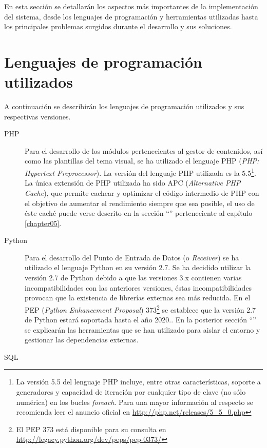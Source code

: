 En esta sección se detallarán los aspectos más importantes de la implementación del sistema, desde los lenguajes de programación y herramientas utilizadas hasta los principales problemas surgidos durante el desarrollo y sus soluciones.


\section{Lenguajes de programación utilizados}
\label{implementacion:lenguajes_programacion}

A continuación se describirán los lenguajes de programación utilizados y sus respectivas versiones.
\begin{description}
	\item[PHP]
		Para el desarrollo de los módulos pertenecientes al gestor de contenidos, así como las plantillas del tema visual, se ha utilizado el lenguaje PHP (\textit{PHP: Hypertext Preprocessor}).  La versión del lenguaje PHP utilizada es la 5.5\footnote{La versión 5.5 del lenguaje PHP incluye, entre otras características, soporte a generadores y capacidad de iteración por cualquier tipo de clave (no sólo numérica) en los bucles \textit{foreach}.  Para una mayor información al respecto se recomienda leer el anuncio oficial en \url{http://php.net/releases/5_5_0.php}}.  La única extensión de PHP utilizada ha sido APC (\textit{Alternative PHP Cache}), que permite cachear y optimizar el código intermedio de PHP con el objetivo de aumentar el rendimiento siempre que sea posible, el uso de éste caché puede verse descrito en la sección ``'' perteneciente al capítulo \ref{chapter05}.
	\item[Python]
		Para el desarrollo del Punto de Entrada de Datos (o \textit{Receiver}) se ha utilizado el lenguaje Python en su versión 2.7. Se ha decidido utilizar la versión 2.7 de Python debido a que las versiones 3.x contienen varias incompatibilidades con las anteriores versiones, éstas incompatibilidades provocan que la existencia de librerías externas sea más reducida.  En el PEP (\textit{Python Enhancement Proposal}) 373\footnote{El PEP 373 está disponible para su consulta en \url{http://legacy.python.org/dev/peps/pep-0373/}} se establece que la versión 2.7 de Python estará soportada hasta el año 2020..  En la posterior sección ``'' se explicarán las herramientas que se han utilizado para aislar el entorno y gestionar las dependencias externas.
	\item[SQL]

\end{description}
